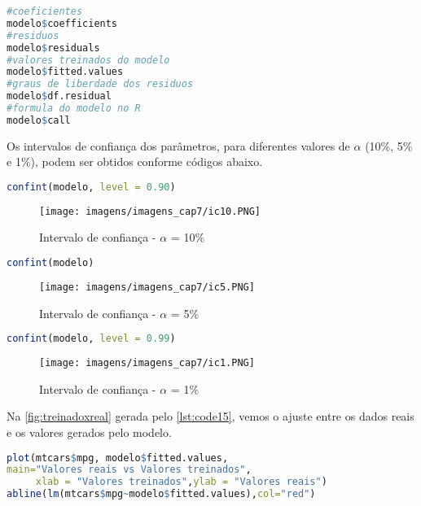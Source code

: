 \begin{lstlisting}[language=R, caption = {Informações do modelo},label={lst:code11}]
#coeficientes
modelo$coefficients
#residuos
modelo$residuals
#valores treinados do modelo
modelo$fitted.values
#graus de liberdade dos residuos
modelo$df.residual
#formula do modelo no R
modelo$call
\end{lstlisting}

\noindent Os intervalos de confiança dos parâmetros, para diferentes valores de $\alpha$ (10\%, 5\% e 1\%), podem ser obtidos conforme códigos abaixo.

\begin{lstlisting}[language=R, caption = {IC com $\alpha$ a 10\%},label={lst:code12}]
confint(modelo, level = 0.90)
\end{lstlisting}

\begin{figure}[H]
\centering
\caption{Intervalo de confiança - $\alpha$ = 10\%}
\texttt{[image: imagens/imagens\_cap7/ic10.PNG]}
\label{fig:ic10}
\end{figure}

\begin{lstlisting}[language=R, caption = {IC com $\alpha$ a 5\%},label={lst:code13}]
confint(modelo)
\end{lstlisting}

\begin{figure}[H]
\centering
\caption{Intervalo de confiança - $\alpha$ = 5\%}
\texttt{[image: imagens/imagens\_cap7/ic5.PNG]}
\label{fig:ic5}
\end{figure}

\begin{lstlisting}[language=R, caption = {IC com $\alpha$ a 1\%},label={lst:code14}]
confint(modelo, level = 0.99)
\end{lstlisting}

\begin{figure}[H]
\centering
\caption{Intervalo de confiança - $\alpha$ = 1\%}
\texttt{[image: imagens/imagens\_cap7/ic1.PNG]}
\label{fig:ic1}
\end{figure}

\noindent Na \autoref{fig:treinadoxreal} gerada pelo \autoref{lst:code15}, vemos o ajuste entre os dados reais e os valores gerados pelo modelo.

\begin{lstlisting}[language=R, caption = {Valores reais vs valores treinados},label={lst:code15}]
plot(mtcars$mpg, modelo$fitted.values, 
main="Valores reais vs Valores treinados",
     xlab = "Valores treinados",ylab = "Valores reais")
abline(lm(mtcars$mpg~modelo$fitted.values),col="red")
\end{lstlisting}

